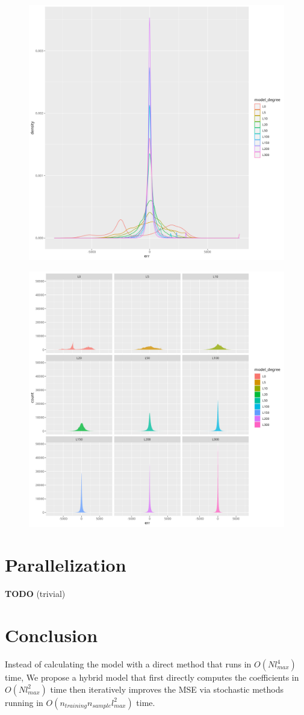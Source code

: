 \documentclass[a4paper]{article}
\theoremstyle{definition}
\begin{document}
\begin{figure}
    \centering
    \includegraphics[width=0.5\linewidth]{media/density_small.png}
\end{figure}

\begin{figure}
    \centering
    \includegraphics[width=0.5\linewidth]{media/faceted_histogram_med.png}

\end{figure}

\section{Parallelization} 

\textbf{TODO} (trivial)

\section{Conclusion}

Instead of calculating the model with a direct method that runs in $O(Nl_{max}^4)$ time, We propose a hybrid model that first directly computes the coefficients in $O(Nl_{max}^2)$ time then 
iteratively improves the MSE via stochastic methods running in $O(n_{training}n_{sample}l_{max}^2)$ time.
\end{document}
